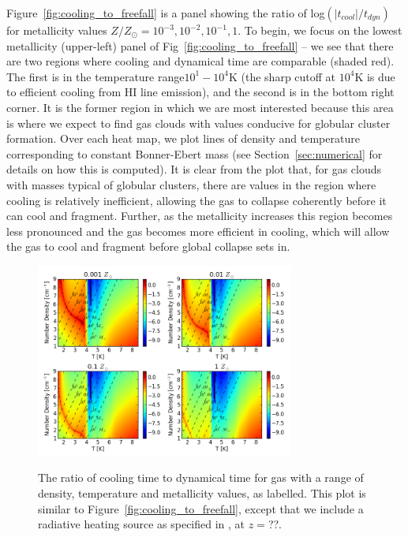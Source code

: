 \documentclass[useAMS,usenatbib]{mn2e}
\begin{document}
Figure~\ref{fig:cooling_to_freefall} is a panel showing the ratio of log$(|t_{cool}|/t_{dyn})$
for metallicity values $Z/Z_{\odot}=10^{-3},10^{-2},10^{-1},1$.  To begin, we focus on the lowest metallicity 
(upper-left) panel of Fig~\ref{fig:cooling_to_freefall} -- we see that there
are two regions where cooling and dynamical time are comparable (shaded red). The first is in the temperature range$10^1-10^4$K (the sharp cutoff at $10^4$K is due to efficient cooling from HI line emission), and the second is in the bottom right
corner. It is the former region in which we are most interested because this area is where we expect to find gas clouds with
values conducive for globular cluster formation. Over each heat map, we plot lines of density and temperature corresponding to constant Bonner-Ebert mass (see Section~\ref{sec:numerical} for details on how this is computed). It is clear from the plot that,
for gas clouds with masses typical of globular clusters, there are 
values in the region where cooling is relatively inefficient, allowing the gas to collapse coherently before it can cool and fragment. Further, as the metallicity
increases this region becomes less pronounced and the gas becomes more efficient in cooling, which will allow the gas to cool and fragment before global collapse sets in.

\begin{figure}
\begin{center}
\mbox{\includegraphics[width=8.5cm]{Images/cooling_to_freefall}}
\end{center}
\caption{\label{fig:cooling_to_freefall_background}} The ratio of cooling time to dynamical time for gas with a range of density, temperature and metallicity values, as labelled.  This plot is similar to Figure~\ref{fig:cooling_to_freefall}, except that we include a radiative heating source as specified in \citet{Haardt2012}, at $z=$??.
\end{figure}
\end{document}
